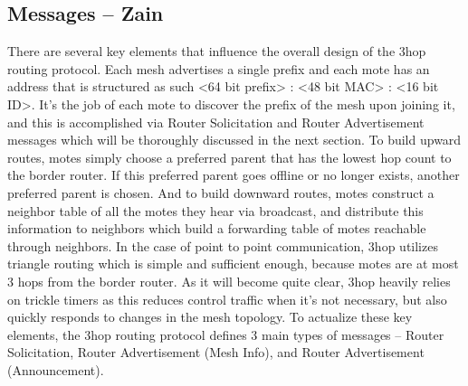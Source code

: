 \subsection{Messages -- Zain}
There are several key elements that influence the overall design of the 3hop routing protocol.
Each mesh advertises a single prefix and each mote has an address that is structured as such <64 bit prefix> : <48 bit MAC> : <16 bit ID>.
It's the job of each mote to discover the prefix of the mesh upon joining it, and this is accomplished via Router Solicitation and Router Advertisement messages which will be thoroughly discussed in the next section.
To build upward routes, motes simply choose a preferred parent that has the lowest hop count to the border router.
If this preferred parent goes offline or no longer exists, another preferred parent is chosen.
And to build downward routes, motes construct a neighbor table of all the motes they hear via broadcast, and distribute this information to neighbors which build a forwarding table of motes reachable through neighbors.
In the case of point to point communication, 3hop utilizes triangle routing which is simple and sufficient enough, because motes are at most 3 hops from the border router.
As it will become quite clear, 3hop heavily relies on trickle timers as this reduces control traffic when it's not necessary, but also quickly responds to changes in the mesh topology.
To actualize these key elements, the 3hop routing protocol defines 3 main types of messages -- Router Solicitation, Router Advertisement (Mesh Info), and Router Advertisement (Announcement).


